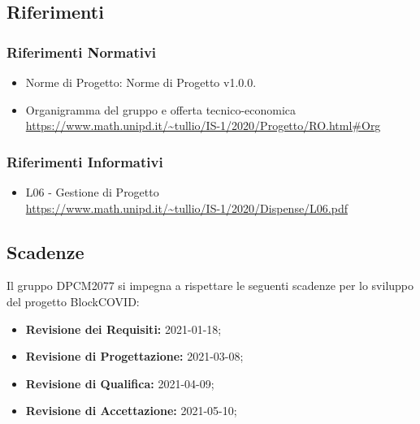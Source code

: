 \subsection{Riferimenti}
\subsubsection{Riferimenti Normativi}
\begin{itemize}
	\item Norme di Progetto: Norme di Progetto v1.0.0.
    \item{Organigramma del gruppo e offerta tecnico-economica} \\
 \url{https://www.math.unipd.it/~tullio/IS-1/2020/Progetto/RO.html#Org}
\end{itemize}
\subsubsection{Riferimenti Informativi}
\begin{itemize}
	\item {L06 - Gestione di Progetto} \\
 \url{https://www.math.unipd.it/~tullio/IS-1/2020/Dispense/L06.pdf}
\end{itemize}

\subsection{Scadenze}
Il gruppo DPCM2077 si impegna a rispettare le seguenti scadenze per lo sviluppo del progetto BlockCOVID:
\begin{itemize}
	\item \textbf{Revisione dei Requisiti:} 2021-01-18; \\
	\item \textbf{Revisione di Progettazione:} 2021-03-08; \\
	\item \textbf{Revisione di Qualifica:} 2021-04-09; \\
	\item \textbf{Revisione di Accettazione:} 2021-05-10; \\
\end{itemize}




